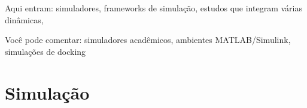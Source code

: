 Aqui entram: simuladores, frameworks de simulação, estudos que integram várias dinâmicas, 

Você pode comentar: simuladores acadêmicos, ambientes MATLAB/Simulink, simulações de docking

\section{Simulação}
\label{sec_simulacao_matlabsimulink}

